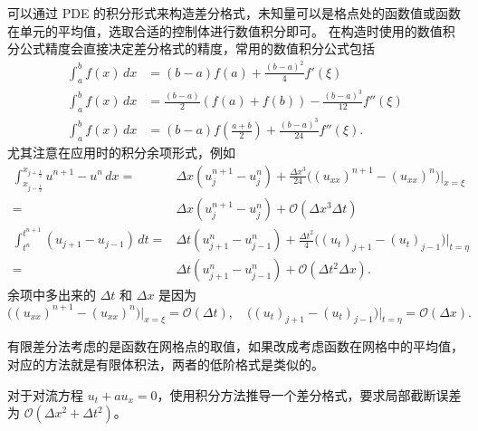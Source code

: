可以通过 PDE 的积分形式来构造差分格式，未知量可以是格点处的函数值或函数在单元的平均值，选取合适的控制体进行数值积分即可。
在构造时使用的数值积分公式精度会直接决定差分格式的精度，常用的数值积分公式包括
\begin{align*}
    \int_{a}^{b} f(x)\,dx & = (b-a) f(a) + \frac{(b-a)^2}4 f'(\xi)                     \\
    \int_{a}^{b} f(x)\,dx & = \frac{(b-a)}{2}(f(a)+f(b)) - \frac{(b-a)^3}{12} f''(\xi) \\
    \int_{a}^{b} f(x)\,dx & = (b-a) f(\frac{a+b}2) + \frac{(b-a)^3}{24} f''(\xi).
\end{align*}
尤其注意在应用时的积分余项形式，例如
\begin{align*}
    \int_{x_{j-\frac12}}^{x_{j+\frac12}} u^{n+1} - u^n \,dx
    ={} & \Delta x (u_j^{n+1} - u_j^n) + \frac{\Delta x^3 }{24} \Big((u_{xx})^{n+1} - (u_{xx})^n\Big)\Big|_{x=\xi}       \\
    ={} & \Delta x (u_j^{n+1} - u_j^n) +  \mathcal{O}(\Delta x^3 \Delta t)                                               \\
    \int_{t^n}^{t^{n+1}} (u_{j+1} - u_{j-1})\, dt
    ={} & \Delta t (u_{j+1}^n - u_{j-1}^n) + \frac{\Delta t^2 }{4} \Big((u_{t})_{j+1} - (u_{t})_{j-1}\Big)\Big|_{t=\eta} \\
    ={} & \Delta t (u_{j+1}^n - u_{j-1}^n) + \mathcal{O}(\Delta t^2 \Delta x).
\end{align*}
余项中多出来的 $\Delta t$ 和 $\Delta x$ 是因为
\[
    \Big((u_{xx})^{n+1} - (u_{xx})^n\Big)\Big|_{x=\xi} = \mathcal{O}(\Delta t), \quad
    \Big((u_{t})_{j+1} - (u_{t})_{j-1}\Big)\Big|_{t=\eta} = \mathcal{O}(\Delta x).
\]

\begin{remark}
    有限差分法考虑的是函数在网格点的取值，如果改成考虑函数在网格中的平均值，对应的方法就是有限体积法，两者的低阶格式是类似的。
\end{remark}

\begin{example}
    对于对流方程 $u_t + a u_x = 0$，使用积分方法推导一个差分格式，要求局部截断误差为 $\mathcal{O}(\Delta x^2+\Delta t^2)$。
\end{example}

